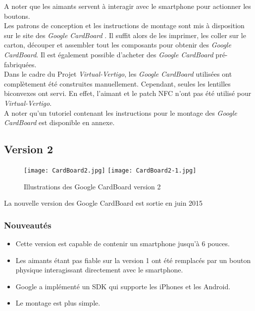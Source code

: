 A noter que les aimants servent à interagir avec le \textsf{smartphone} pour actionner les boutons. \\

Les patrons de conception et les instructions de montage sont mis à disposition sur le site des \textit{Google CardBoard} \cite{CardBoard}. Il suffit alors de les imprimer, les coller sur le carton, découper et assembler tout les composants pour obtenir des \textit{Google CardBoard}. Il est également possible d'acheter des \textit{Google CardBoard} pré-fabriquées.\\

Dans le cadre du Projet \textit{Virtual-Vertigo}, les \textit{Google CardBoard} utilisées ont complètement été construites manuellement. Cependant, seules les lentilles biconvexes ont servi. En effet, l'aimant et le patch NFC n'ont pas été utilisé pour \textit{Virtual-Vertigo}.\\

A noter qu'un tutoriel contenant les instructions pour le montage des \textit{Google CardBoard} est disponible en annexe.

\subsection*{Version 2} 
\begin{figure}[h]
	\centering
		\texttt{[image: CardBoard2.jpg]}
		\texttt{[image: CardBoard2-1.jpg]}
	\caption{\label{CardBoard2} Illustrations des Google CardBoard version 2}
\end{figure}
La nouvelle version des Google CardBoard est sortie en juin 2015

\subsubsection{Nouveautés}
\begin{itemize}
	\item Cette version est capable de contenir un \textsf{smartphone} jusqu'à 6 pouces.
	\item Les aimants étant pas fiable sur la version 1 ont été remplacés par un bouton physique interagissant directement avec le \textsf{smartphone}.
	\item Google a implémenté un SDK qui supporte les \textsf{iPhones} et les \textsf{Android}.
	\item Le montage est plus simple.
\end{itemize}

